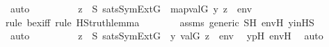 \begin{isabellebody}
\ auto\isanewline
\ \ \ \ \isamarkupfalse%
\ \isamarkupfalse%
\ {\isachardoublequoteopen}{\isachardot}{\kern0pt}{\isachardot}{\kern0pt}{\isachardot}{\kern0pt}\ {\isasymlongleftrightarrow}\ {\isacharparenleft}{\kern0pt}{\isasymexists}z{\isacharprime}{\kern0pt}\ {\isasymin}\ S{\isachardot}{\kern0pt}\ sats{\isacharparenleft}{\kern0pt}SymExt{\isacharparenleft}{\kern0pt}G{\isacharparenright}{\kern0pt}{\isacharcomma}{\kern0pt}\ {\isasymphi}{\isacharcomma}{\kern0pt}\ map{\isacharparenleft}{\kern0pt}val{\isacharparenleft}{\kern0pt}G{\isacharparenright}{\kern0pt}{\isacharcomma}{\kern0pt}\ {\isacharbrackleft}{\kern0pt}y{\isacharprime}{\kern0pt}{\isacharcomma}{\kern0pt}\ z{\isacharprime}{\kern0pt}{\isacharbrackright}{\kern0pt}\ {\isacharat}{\kern0pt}\ env{\isacharprime}{\kern0pt}{\isacharparenright}{\kern0pt}{\isacharparenright}{\kern0pt}{\isacharparenright}{\kern0pt}{\isachardoublequoteclose}\ \isanewline
\ \ \ \ \ \ \isamarkupfalse%
{\isacharparenleft}{\kern0pt}rule\ bex{\isacharunderscore}{\kern0pt}iff{\isacharcomma}{\kern0pt}\ rule\ HS{\isacharunderscore}{\kern0pt}truth{\isacharunderscore}{\kern0pt}lemma{\isacharparenright}{\kern0pt}\isanewline
\ \ \ \ \ \ \isamarkupfalse%
\ assms\ generic\ SH\ env{\isacharprime}{\kern0pt}H\ y{\isacharprime}{\kern0pt}inHS\isanewline
\ \ \ \ \ \ \isamarkupfalse%
\ auto\isanewline
\ \ \ \ \isamarkupfalse%
\ \isamarkupfalse%
\ {\isachardoublequoteopen}{\isachardot}{\kern0pt}{\isachardot}{\kern0pt}{\isachardot}{\kern0pt}\ {\isasymlongleftrightarrow}\ {\isacharparenleft}{\kern0pt}{\isasymexists}z{\isacharprime}{\kern0pt}\ {\isasymin}\ S{\isachardot}{\kern0pt}\ sats{\isacharparenleft}{\kern0pt}SymExt{\isacharparenleft}{\kern0pt}G{\isacharparenright}{\kern0pt}{\isacharcomma}{\kern0pt}\ {\isasymphi}{\isacharcomma}{\kern0pt}\ {\isacharbrackleft}{\kern0pt}y{\isacharcomma}{\kern0pt}\ val{\isacharparenleft}{\kern0pt}G{\isacharcomma}{\kern0pt}\ z{\isacharprime}{\kern0pt}{\isacharparenright}{\kern0pt}{\isacharbrackright}{\kern0pt}\ {\isacharat}{\kern0pt}\ env{\isacharparenright}{\kern0pt}{\isacharparenright}{\kern0pt}{\isachardoublequoteclose}\ \isamarkupfalse%
\ y{\isacharprime}{\kern0pt}pH\ env{\isacharprime}{\kern0pt}H\ \isamarkupfalse%
\ auto\isanewline
\ \ \ \ \isamarkupfalse%
\ \isamarkupfalse%

\end{isabellebody}
